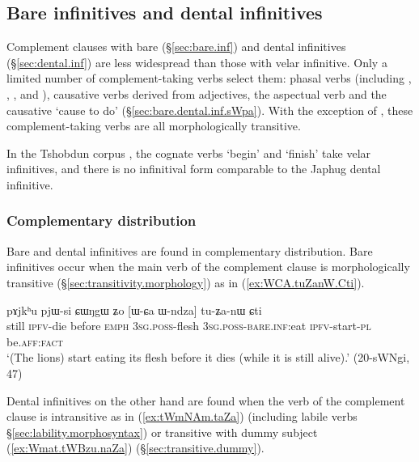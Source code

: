  \subsection{Bare infinitives and dental infinitives} \label{sec:bare.dental.inf}
Complement clauses with bare (§\ref{sec:bare.inf}) and dental infinitives (§\ref{sec:dental.inf}) are less widespread than those with velar infinitive. Only a limited number of complement-taking verbs select them: phasal verbs (including , , , and ), causative verbs derived from adjectives, the aspectual verb  and the causative  `cause to do' (§\ref{sec:bare.dental.inf.sWpa}). With the exception of , these complement-taking verbs are all morphologically transitive.

In the Tshobdun corpus \citet{jackson19tshobdun}, the cognate verbs  `begin'  and  `finish' take velar infinitives, and there is no infinitival form comparable to the Japhug dental infinitive.

\subsubsection{Complementary distribution} \label{sec:bare.inf.dental.complementary}
Bare and dental infinitives are found in complementary distribution. Bare infinitives occur when the main verb of the complement clause is morphologically transitive (§\ref{sec:transitivity.morphology}) as in (\ref{ex:WCA.tuZanW.Cti}).

\begin{exe} 
\ex \label{ex:WCA.tuZanW.Cti}
\gll pɤjkʰu pjɯ-si ɕɯŋgɯ ʑo [ɯ-ɕa ɯ-ndza] tu-ʑa-nɯ ɕti \\
still \textsc{ipfv}-die before \textsc{emph} \textsc{3sg}.\textsc{poss}-flesh \textsc{3sg}.\textsc{poss}-\textsc{bare}.\textsc{inf}:eat \textsc{ipfv}-start-\textsc{pl} be.\textsc{aff}:\textsc{fact} \\
\glt `(The lions) start eating its flesh before it dies (while it is still alive).' (20-sWNgi, 47)
  \end{exe} 

Dental infinitives on the other hand are  found when the verb of the complement clause is intransitive as in (\ref{ex:tWmNAm.taZa}) (including labile verbs §\ref{sec:lability.morphosyntax}) or transitive with dummy subject (\ref{ex:Wmat.tWBzu.naZa}) (§\ref{sec:transitive.dummy}).

